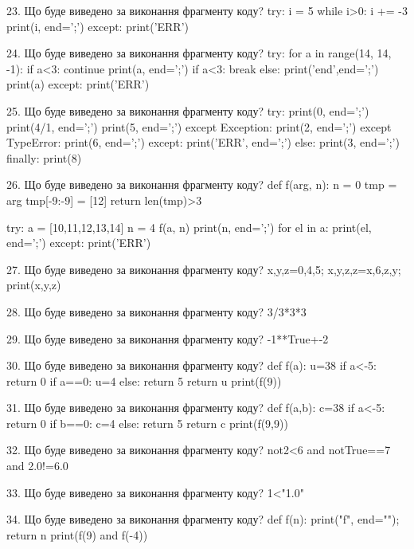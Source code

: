 \documentclass[11pt]{article}
\begin{document}

23. Що буде виведено за виконання фрагменту коду?
try:
    i = 5
    while i>0:
        i += -3
    print(i, end=';')
except:
    print('ERR')


24. Що буде виведено за виконання фрагменту коду?
try:
    for a in range(14, 14, -1):
        if a<3:
            continue
        print(a, end=';')
        if a<3:
            break
    else:
        print('end',end=';')
    print(a)
except:
    print('ERR')


25. Що буде виведено за виконання фрагменту коду?
try:
    print(0, end=';')
    print(4/1, end=';')
    print(5, end=';')
except Exception:
    print(2, end=';')
except TypeError:
    print(6, end=';')
except:
    print('ERR', end=';')
else:
    print(3, end=';')
finally:
    print(8)


26. Що буде виведено за виконання фрагменту коду?
def f(arg, n):
    n = 0
    tmp = arg
    tmp[-9:-9] = [12]
    return len(tmp)>3

try:
    a = [10,11,12,13,14]
    n = 4
    f(a, n)
    print(n, end=';')
    for el in a:
        print(el, end=';')
except:
    print('ERR')


27. Що буде виведено за виконання фрагменту коду?
x,y,z=0,4,5;  x,y,z,z=x,6,z,y;  print(x,y,z)

28. Що буде виведено за виконання фрагменту коду?
3/3*3*3

29. Що буде виведено за виконання фрагменту коду?
-1**True+-2

30. Що буде виведено за виконання фрагменту коду?
def f(a):
      u=38
      if a<-5: return 0
      if a==0: u=4
      else: return 5
      return u
   print(f(9))

31. Що буде виведено за виконання фрагменту коду?
def f(a,b):
      c=38
      if a<-5: return 0
      if b==0: c=4
      else: return 5
      return c
   print(f(9,9))

32. Що буде виведено за виконання фрагменту коду?
not2<6 and notTrue==7 and 2.0!=6.0

33. Що буде виведено за виконання фрагменту коду?
1<"1.0"

34. Що буде виведено за виконання фрагменту коду?
def f(n): print("f", end=""); return n
   print(f(9) and f(-4))
\end{document}
